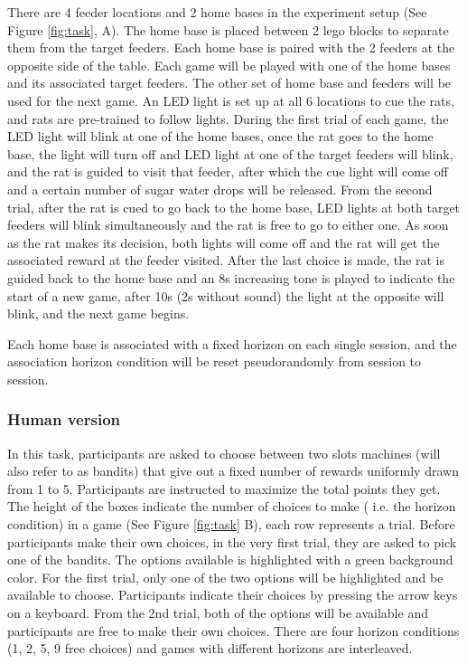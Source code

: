 \documentclass[12pt]{article}
\begin{document}
There are 4 feeder locations and 2 home bases in the experiment setup (See Figure \ref{fig:task}, A). The home base is placed between 2 lego blocks to separate them from the target feeders. Each home base is paired with the 2 feeders at the opposite side of the table. Each game will be played with one of the home bases and its associated target feeders. The other set of home base and feeders will be used for the next game. An LED light is set up at all 6 locations to cue the rats, and rats are pre-trained to follow lights. During the first trial of each game, the LED light will blink at one of the home bases, once the rat goes to the home base, the light will turn off and LED light at one of the target feeders will blink, and the rat is guided to visit that feeder, after which the cue light will come off and a certain number of sugar water drops will be released. From the second trial, after the rat is cued to go back to the home base, LED lights at both target feeders will blink simultaneously and the rat is free to go to either one. As soon as the rat makes its decision, both lights will come off and the rat will get the associated reward at the feeder visited. After the last choice is made, the rat is guided back to the home base and an 8s increasing tone is played to indicate the start of a new game,  after 10s (2s without sound) the light at the opposite will blink, and the next game begins.

Each home base is associated with a fixed horizon on each single session, and the association horizon condition will be reset pseudorandomly from session to session. %

\subsubsection*{Human version}
In this task, participants are asked to choose between two slots machines (will also refer to as bandits) that give out a fixed number of rewards uniformly drawn from 1 to 5.  Participants are instructed to maximize the total points they get. The height of the boxes indicate the number of choices to make ( i.e. the horizon condition) in a game (See Figure \ref{fig:task} B), each row represents a trial. Before participants make their own choices, in the very first trial, they are asked to pick one of the bandits. The options available is highlighted with a green background color. For the first trial, only one of the two options will be highlighted and be available to choose. Participants indicate their choices by pressing the arrow keys on a keyboard. From the 2nd trial, both of the options will be available and participants are free to make their own choices. There are four horizon conditions (1, 2, 5, 9 free choices) and games with different horizons are interleaved. 
\end{document}
